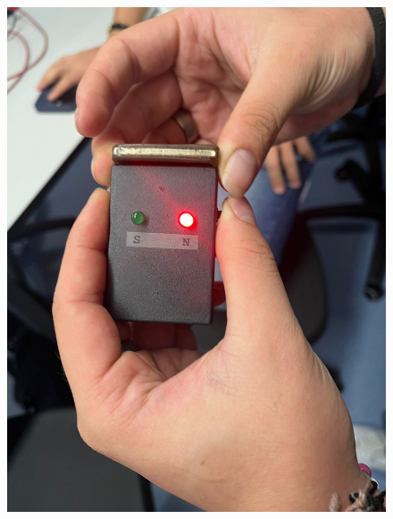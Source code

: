 \begin{figure}[H]
  \hfill
  \begin{minipage}{0.3\textwidth}
    \centering
    \includegraphics[width=\textwidth]{Figures/1. Content/BuscarPolaridad6.jpeg}
    \label{fig: Polaridad Negativa del Iman 1}
  \end{minipage}
  \hfill
  \begin{minipage}{0.3\textwidth}
    \centering

\end{minipage}
\end{figure}
